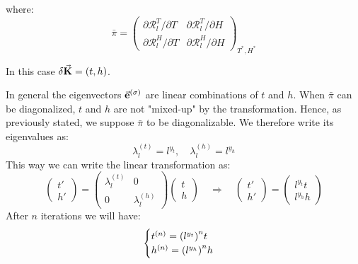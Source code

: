 \documentclass[../main/main.tex]{subfiles}
\begin{document}
where:
\begin{equation}
  \bar{\pi } =
  \begin{pmatrix}
    \partial{\mathcal{R}_l^T} / \partial{T}  & \partial{\mathcal{R}_l^T} / \partial{H} \\
     \partial{\mathcal{R}_l^H} / \partial{T}  &\partial{\mathcal{R}_l^H} / \partial{H}
  \end{pmatrix}_{T^*,H^*}
\end{equation}
\begin{remark}
In this case \( \delta \va{K}  = (t,h) \).
\end{remark}

In general the eigenvectors \( \va{e}^{(\sigma )} \) are linear combinations of \( t \) and \( h \). When \( \bar{\pi }  \) can be diagonalized, \( t \) and \( h \) are not "mixed-up" by the transformation. Hence, as previously stated, we suppose \( \bar{\pi }  \) to be diagonalizable. We therefore write its eigenvalues as:
\begin{equation}
  \lambda _l ^{(t)} = l^{y_t}, \quad \lambda _l^{(h)} = l ^{y_h}
\end{equation}
This way we can write the linear transformation as:
\begin{equation}
  \begin{pmatrix}
  t' \\
  h'
  \end{pmatrix}
  =
  \begin{pmatrix}
  \lambda _l^{(t)}   & 0 \\
    0 & \lambda _l^{(h)}
  \end{pmatrix}
  \begin{pmatrix}
  t \\
  h
  \end{pmatrix} \quad \Rightarrow \quad
  \begin{pmatrix}
  t' \\
  h'
  \end{pmatrix}
  =
  \begin{pmatrix}
  l^{y_t} t \\
  l ^{y_h} h
  \end{pmatrix}
\end{equation}
After \( n \) iterations we will have:
\begin{equation}
  \begin{cases}
   t^{(n)} = \qty(l^{y_t})^n t  \\
  h^{(n)} = \qty(l^{y_h})^n h
  \end{cases}
\end{equation}
\end{document}
